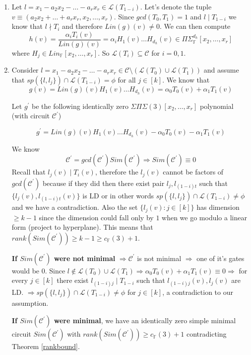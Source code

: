 \documentclass[letterpaper,USenglish,numberwithinsect]{lipics}
\newcommand{\F}{\mathbb{F}}
\newcommand{\ML}{\mathcal{L}}
\newcommand{\MC}{\mathcal{C}}
\begin{document}
\begin{enumerate}
\item Let $l = x_1-a_2x_2-\ldots- a_rx_r \in \ML(T_{1-i})$. Let's denote the tuple
$v\equiv (a_2x_2+\ldots + a_rx_r,x_2,\ldots,x_r)$.
Since $gcd(T_0,T_1)=1$ and $l\mid T_{1-i}$ we know that $l\nmid T_i$ and therefore $Lin(g)(v)\neq 0$. We can then compute
\[
h(v) = \frac{\alpha_{i}T_{i}(v)}
{Lin(g)(v)}
= \alpha_{i}H_1(v)\ldots H_{d_h}(v)\in \Pi\Sigma^{d_h}_{\F}[x_2,\ldots,x_r]
\]
where $H_j \in Lin_{\F}[x_2,\ldots,x_r]$. So $\ML(T_i)\subseteq \MC$ for $i=0,1$.

\item Consider $l=x_1-a_2x_2-\ldots- a_rx_r \in \MC\setminus (\ML(T_0)\cup \ML(T_1))$ and assume that
$sp(\{l,l_j\})\cap \ML(T_{1-i})=\phi$ for all $j\in[k]$. We know that
 \[
 g(v) = Lin(g)(v) H_1(v)\ldots H_{d_h}(v) = \alpha_0T_0(v) + \alpha_1T_1(v)
\]

Let $g^\prime $ be the following identically zero $\Sigma\Pi\Sigma(3)[x_2,\ldots,x_r]$
polynomial (with circuit $\MC^\prime$)

 \[
 g^\prime = Lin(g)(v) H_1(v)\ldots H_{d_h}(v) -\alpha_0T_0(v) -
\alpha_1T_1(v)
\]

We know
\[
 \MC^\prime = gcd(\MC^\prime) Sim(\MC^\prime) \Rightarrow Sim(\MC^\prime)\equiv
0
\]
Recall that $l_j(v)\mid T_{i}(v)$, therefore
the $l_j(v)$ cannot be factors of $gcd(\MC^\prime)$
because if they did then there exist pair $l_{j}, l_{(1-i)t}$ such that
$\{l_{j}(v), l_{(1-i)t}(v)\}$ is LD or in other words $sp(\{l,l_j\})\cap \ML(T_{1-i})\neq \phi$ and we have a contradiction.
Also the set $\{l_j(v) : j\in [k]\}$ has dimension $\geq k-1$ since
the dimension could fall only
by $1$ when we go modulo a linear form (project to hyperplane). This means that $rank(Sim(\MC^\prime))\geq k-1\geq
c_{\F}(3)+1$.

{\bf If $Sim(\MC^\prime)$ were not minimal} $\Rightarrow \MC^\prime$ is not minimal $\Rightarrow$ one of it's gates would be $0$.
Since $l\notin \ML(T_0)\cup\ML(T_1) \Rightarrow \alpha_0T_0(v)+\alpha_1T_1(v) \equiv 0
\Rightarrow$ for every $j\in [k]$ there exist $l_{(1-i)j}\mid T_{1-i}$ such that $l_{(1-i)j}(v),l_j(v)$ are LD.
$\Rightarrow sp(\{l,l_j\})\cap \ML(T_{1-i}) \neq \phi$ for $j\in [k]$,
a contradiction to our assumption.

{\bf If $Sim(\MC^\prime)$ were minimal}, we have an identically zero simple
minimal circuit $Sim(\MC^\prime)$ with $rank(Sim(\MC^\prime))\geq c_{\F}(3)+1 $
contradicting Theorem \ref{rankbound}.


\end{enumerate}
\end{document}
